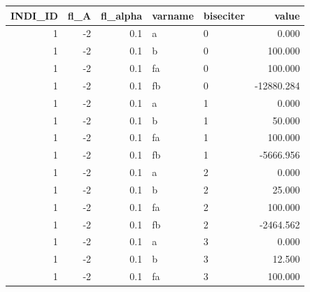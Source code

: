 \documentclass[
]{book}
\newenvironment{Shaded}{\begin{snugshade}}{\end{snugshade}}
\newcommand{\DecValTok}[1]{\textcolor[rgb]{0.00,0.00,0.81}{#1}}
\newcommand{\KeywordTok}[1]{\textcolor[rgb]{0.13,0.29,0.53}{\textbf{#1}}}
\newcommand{\NormalTok}[1]{#1}
\newcommand{\OperatorTok}[1]{\textcolor[rgb]{0.81,0.36,0.00}{\textbf{#1}}}
\newcommand{\StringTok}[1]{\textcolor[rgb]{0.31,0.60,0.02}{#1}}
\begin{document}
\begin{table}[!h]
\centering
\begin{tabular}{r|r|r|l|l|r}
\hline
INDI\_ID & fl\_A & fl\_alpha & varname & biseciter & value\\
\hline
\rowcolor{gray!6}  1 & -2 & 0.1 & a & 0 & 0.000\\
\hline
1 & -2 & 0.1 & b & 0 & 100.000\\
\hline
\rowcolor{gray!6}  1 & -2 & 0.1 & fa & 0 & 100.000\\
\hline
1 & -2 & 0.1 & fb & 0 & -12880.284\\
\hline
\rowcolor{gray!6}  1 & -2 & 0.1 & a & 1 & 0.000\\
\hline
1 & -2 & 0.1 & b & 1 & 50.000\\
\hline
\rowcolor{gray!6}  1 & -2 & 0.1 & fa & 1 & 100.000\\
\hline
1 & -2 & 0.1 & fb & 1 & -5666.956\\
\hline
\rowcolor{gray!6}  1 & -2 & 0.1 & a & 2 & 0.000\\
\hline
1 & -2 & 0.1 & b & 2 & 25.000\\
\hline
\rowcolor{gray!6}  1 & -2 & 0.1 & fa & 2 & 100.000\\
\hline
1 & -2 & 0.1 & fb & 2 & -2464.562\\
\hline
\rowcolor{gray!6}  1 & -2 & 0.1 & a & 3 & 0.000\\
\hline
1 & -2 & 0.1 & b & 3 & 12.500\\
\hline
\rowcolor{gray!6}  1 & -2 & 0.1 & fa & 3 & 100.000\\
\hline
\end{tabular}
\end{table}

\begin{Shaded}
\end{Shaded}
\end{document}
